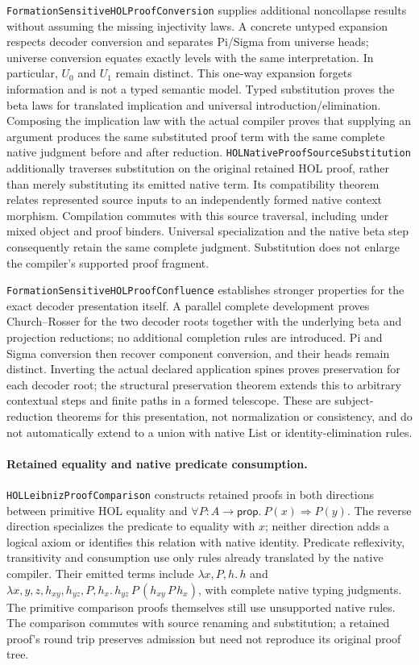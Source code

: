 \documentclass[11pt]{article}
\theoremstyle{definition}
\theoremstyle{remark}
\begin{document}
\nolinkurl{FormationSensitiveHOLProofConversion} supplies additional
noncollapse results without assuming the missing injectivity laws. A concrete
untyped expansion respects decoder conversion and separates Pi/Sigma from
universe heads; universe conversion equates exactly levels with the same
interpretation. In particular, \(U_0\) and \(U_1\) remain distinct. This
one-way expansion forgets information and is not a typed semantic model.
Typed substitution proves the beta laws for translated implication and
universal introduction/elimination. Composing the implication law with the
actual compiler proves that supplying an argument produces the same
substituted proof term with the same complete native judgment before and
after reduction.
\nolinkurl{HOLNativeProofSourceSubstitution} additionally traverses
substitution on the original retained HOL proof, rather than merely
substituting its emitted native term. Its compatibility theorem relates
represented source inputs to an independently formed native context
morphism. Compilation commutes with this source traversal, including under
mixed object and proof binders. Universal specialization and the native
beta step consequently retain the same complete judgment. Substitution
does not enlarge the compiler's supported proof fragment.

\nolinkurl{FormationSensitiveHOLProofConfluence} establishes stronger
properties for the exact decoder presentation itself. A parallel complete
development proves Church--Rosser for the two decoder roots together with
the underlying beta and projection reductions; no additional completion
rules are introduced. Pi and Sigma conversion then recover component
conversion, and their heads remain distinct. Inverting the actual declared
application spines proves preservation for each decoder root; the structural
preservation theorem extends this to arbitrary contextual steps and finite
paths in a formed telescope. These are subject-reduction theorems for this
presentation, not normalization or consistency, and do not automatically
extend to a union with native List or identity-elimination rules.

\paragraph{Retained equality and native predicate consumption.}
\nolinkurl{HOLLeibnizProofComparison} constructs retained proofs in both
directions between primitive HOL equality and
\(\forall P:A\to\mathsf{prop}.\ P(x)\Rightarrow P(y)\).
The reverse direction specializes the predicate to equality with \(x\);
neither direction adds a logical axiom or identifies this relation with
native identity. Predicate reflexivity, transitivity and consumption use
only rules already translated by the native compiler. Their emitted terms
include \(\lambda x,P,h.\,h\) and
\(\lambda x,y,z,h_{xy},h_{yz},P,h_x.\,h_{yz}\,P\,(h_{xy}\,P\,h_x)\),
with complete native typing judgments. The primitive comparison proofs
themselves still use unsupported native rules. The comparison commutes
with source renaming and substitution; a retained proof's round trip
preserves admission but need not reproduce its original proof tree.
\end{document}
